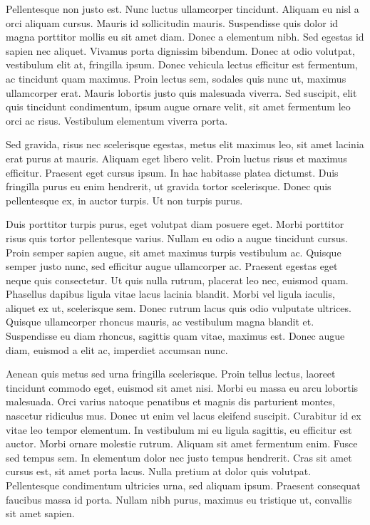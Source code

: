 Pellentesque non justo est. Nunc luctus ullamcorper tincidunt. Aliquam eu nisl a orci aliquam cursus. Mauris id sollicitudin mauris. Suspendisse quis dolor id magna porttitor mollis eu sit amet diam. Donec a elementum nibh. Sed egestas id sapien nec aliquet. Vivamus porta dignissim bibendum. Donec at odio volutpat, vestibulum elit at, fringilla ipsum. Donec vehicula lectus efficitur est fermentum, ac tincidunt quam maximus. Proin lectus sem, sodales quis nunc ut, maximus ullamcorper erat. Mauris lobortis justo quis malesuada viverra. Sed suscipit, elit quis tincidunt condimentum, ipsum augue ornare velit, sit amet fermentum leo orci ac risus. Vestibulum elementum viverra porta.

Sed gravida, risus nec scelerisque egestas, metus elit maximus leo, sit amet lacinia erat purus at mauris. Aliquam eget libero velit. Proin luctus risus et maximus efficitur. Praesent eget cursus ipsum. In hac habitasse platea dictumst. Duis fringilla purus eu enim hendrerit, ut gravida tortor scelerisque. Donec quis pellentesque ex, in auctor turpis. Ut non turpis purus.

Duis porttitor turpis purus, eget volutpat diam posuere eget. Morbi porttitor risus quis tortor pellentesque varius. Nullam eu odio a augue tincidunt cursus. Proin semper sapien augue, sit amet maximus turpis vestibulum ac. Quisque semper justo nunc, sed efficitur augue ullamcorper ac. Praesent egestas eget neque quis consectetur. Ut quis nulla rutrum, placerat leo nec, euismod quam. Phasellus dapibus ligula vitae lacus lacinia blandit. Morbi vel ligula iaculis, aliquet ex ut, scelerisque sem. Donec rutrum lacus quis odio vulputate ultrices. Quisque ullamcorper rhoncus mauris, ac vestibulum magna blandit et. Suspendisse eu diam rhoncus, sagittis quam vitae, maximus est. Donec augue diam, euismod a elit ac, imperdiet accumsan nunc.

Aenean quis metus sed urna fringilla scelerisque. Proin tellus lectus, laoreet tincidunt commodo eget, euismod sit amet nisi. Morbi eu massa eu arcu lobortis malesuada. Orci varius natoque penatibus et magnis dis parturient montes, nascetur ridiculus mus. Donec ut enim vel lacus eleifend suscipit. Curabitur id ex vitae leo tempor elementum. In vestibulum mi eu ligula sagittis, eu efficitur est auctor. Morbi ornare molestie rutrum. Aliquam sit amet fermentum enim. Fusce sed tempus sem. In elementum dolor nec justo tempus hendrerit. Cras sit amet cursus est, sit amet porta lacus. Nulla pretium at dolor quis volutpat. Pellentesque condimentum ultricies urna, sed aliquam ipsum. Praesent consequat faucibus massa id porta. Nullam nibh purus, maximus eu tristique ut, convallis sit amet sapien.

